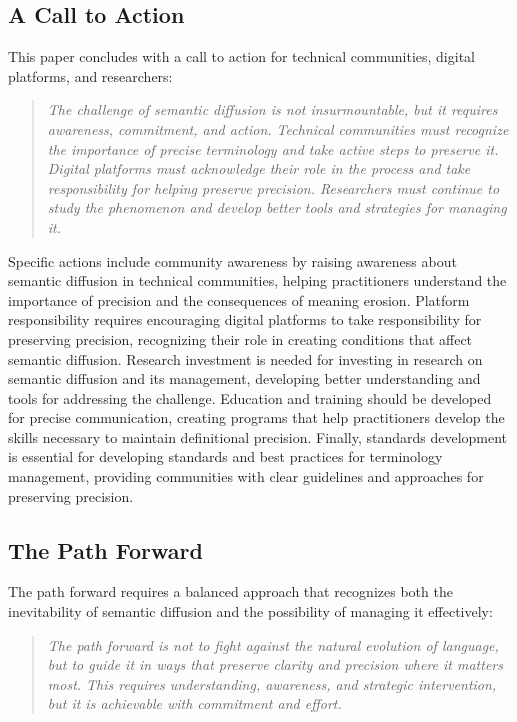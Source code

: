 \documentclass[11pt]{article}
\begin{document}
\subsection{A Call to Action}

This paper concludes with a call to action for technical communities, digital platforms, and researchers:

\begin{quote}
\emph{The challenge of semantic diffusion is not insurmountable, but it requires awareness, commitment, and action. Technical communities must recognize the importance of precise terminology and take active steps to preserve it. Digital platforms must acknowledge their role in the process and take responsibility for helping preserve precision. Researchers must continue to study the phenomenon and develop better tools and strategies for managing it.}
\end{quote}

Specific actions include community awareness by raising awareness about semantic diffusion in technical communities, helping practitioners understand the importance of precision and the consequences of meaning erosion. Platform responsibility requires encouraging digital platforms to take responsibility for preserving precision, recognizing their role in creating conditions that affect semantic diffusion. Research investment is needed for investing in research on semantic diffusion and its management, developing better understanding and tools for addressing the challenge. Education and training should be developed for precise communication, creating programs that help practitioners develop the skills necessary to maintain definitional precision. Finally, standards development is essential for developing standards and best practices for terminology management, providing communities with clear guidelines and approaches for preserving precision.

\subsection{The Path Forward}

The path forward requires a balanced approach that recognizes both the inevitability of semantic diffusion and the possibility of managing it effectively:

\begin{quote}
\emph{The path forward is not to fight against the natural evolution of language, but to guide it in ways that preserve clarity and precision where it matters most. This requires understanding, awareness, and strategic intervention, but it is achievable with commitment and effort.}
\end{quote}
\end{document}

